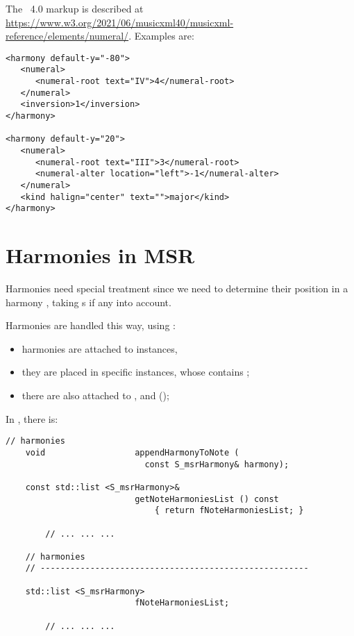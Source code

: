 The \mxml\ 4.0  markup is described at \url{https://www.w3.org/2021/06/musicxml40/musicxml-reference/elements/numeral/}.
Examples are:
\begin{lstlisting}[language=MusicXML]
<harmony default-y="-80">
   <numeral>
      <numeral-root text="IV">4</numeral-root>
   </numeral>
   <inversion>1</inversion>
</harmony>

<harmony default-y="20">
   <numeral>
      <numeral-root text="III">3</numeral-root>
      <numeral-alter location="left">-1</numeral-alter>
   </numeral>
   <kind halign="center" text="">major</kind>
</harmony>
\end{lstlisting}


\section{Harmonies in MSR}

Harmonies need special treatment since we need to determine their position in a harmony , taking
s if any into account.

Harmonies are handled this way, using \denorm:
\begin{itemize}
\item harmonies are attached to  instances,
\item they are placed in specific  instances, whose  contains ;
\item there are also attached to ,  and  (\denorm);
\end{itemize}

In , there is:
\begin{lstlisting}[language=CPlusPlus]
    // harmonies
    void                  appendHarmonyToNote (
                            const S_msrHarmony& harmony);

    const std::list <S_msrHarmony>&
                          getNoteHarmoniesList () const
                              { return fNoteHarmoniesList; }

		// ... ... ...

    // harmonies
    // ------------------------------------------------------

    std::list <S_msrHarmony>
                          fNoteHarmoniesList;

		// ... ... ...
\end{lstlisting}


